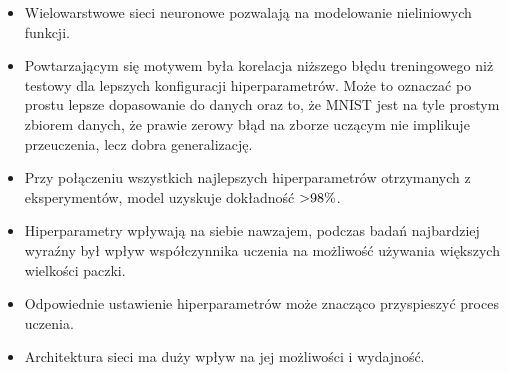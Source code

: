 \documentclass{article}
\begin{document}
\begin{itemize}
	\item Wielowarstwowe sieci neuronowe pozwalają na modelowanie nieliniowych funkcji.
	\item Powtarzającym się motywem była korelacja niższego błędu treningowego niż testowy dla lepszych konfiguracji hiperparametrów. Może to oznaczać po prostu lepsze dopasowanie do danych oraz to, że MNIST jest na tyle prostym zbiorem danych, że prawie zerowy błąd na zborze uczącym nie implikuje przeuczenia, lecz dobra generalizację.
	\item Przy połączeniu wszystkich najlepszych hiperparametrów otrzymanych z eksperymentów, model uzyskuje dokładność \($>98\%$\).
	\item Hiperparametry wpływają na siebie nawzajem, podczas badań najbardziej wyraźny był wpływ współczynnika uczenia na możliwość używania większych wielkości paczki.
	\item Odpowiednie ustawienie hiperparametrów może znacząco przyspieszyć proces uczenia.
	\item Architektura sieci ma duży wpływ na jej możliwości i wydajność.
\end{itemize}
\end{document}
